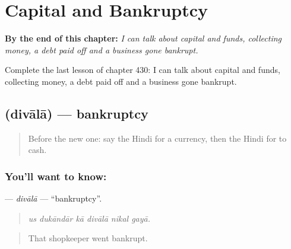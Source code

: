 
\chapter{Capital and Bankruptcy}
\label{ch:hi-capital-and-bankruptcy}

\begin{chapteropening}
\textbf{By the end of this chapter:} \emph{I can talk about capital and funds, collecting money, a debt paid off and a business gone bankrupt.}

Complete the last lesson of chapter 430: I can talk about capital and funds, collecting money, a debt paid off and a business gone bankrupt.
\end{chapteropening}

\section[\texorpdfstring{\hi{दिवाला} (divālā)}{दिवाला (divālā)}]{ (divālā) — bankruptcy}

\label{lesson:HI-C430-divala}



\begin{quote}
Before the new one: say the Hindi for a currency, then the Hindi for to cash.
\end{quote}

\subsection*{You'll want to know: }
\textbf{} — \emph{divālā} — \textquotedblleft{}bankruptcy\textquotedblright{}.

\begin{quote}
     
\end{quote}

\begin{quote}
\emph{us dukāndār kā divālā nikal gayā.}
\end{quote}

\begin{quote}
That shopkeeper went bankrupt.
\end{quote}

